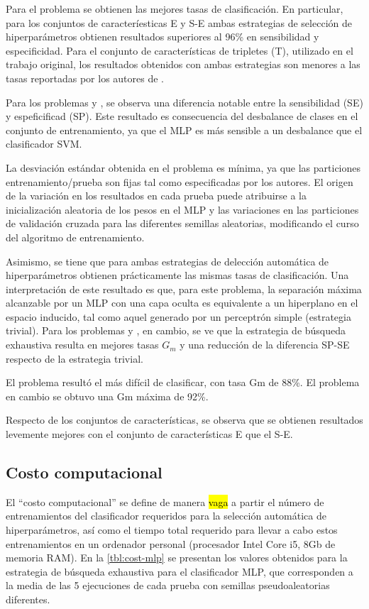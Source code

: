 Para el problema \tripletsvm{} se obtienen las mejores tasas de
clasificación.  En particular, para los conjuntos de caracteríesticas
E y S-E ambas estrategias de selección de hiperparámetros obtienen
resultados superiores al 96\% en sensibilidad y especificidad.  Para
el conjunto de características de tripletes (T), utilizado en el
trabajo original, los resultados obtenidos con ambas estrategias son
menores a las tasas reportadas por los autores de \tripletsvm{}.

Para los problemas \mipred{} y \micropred{}, se observa una diferencia
notable entre la sensibilidad (SE) y espeficificad (SP). Este
resultado es consecuencia del desbalance de clases en el conjunto de
entrenamiento, ya que el MLP es más sensible a un desbalance que el
clasificador SVM.

La desviación estándar obtenida en el problema \tripletsvm{} es
mínima, ya que las particiones entrenamiento/prueba son fijas tal como
especificadas por los autores.  El origen de la variación en los
resultados en cada prueba puede atribuirse a la inicialización
aleatoria de los pesos en el MLP y las variaciones en las particiones
de validación cruzada para las diferentes semillas aleatorias,
modificando el curso del algoritmo de entrenamiento.

Asimismo, se tiene que para \tripletsvm{} ambas estrategias de
delección automática de hiperparámetros obtienen prácticamente las
mismas tasas de clasificación.  Una interpretación de este resultado
es que, para este problema, la separación máxima alcanzable por un MLP
con una capa oculta es equivalente a un hiperplano en el espacio
inducido, tal como aquel generado por un perceptrón simple (estrategia
trivial).  Para los problemas \mipred{} y \micropred{}, en cambio, se
ve que la estrategia de búsqueda exhaustiva resulta en mejores tasas
$G_m$ y una reducción de la diferencia SP-SE respecto de la estrategia
trivial.

El problema \micropred{} resultó el más difícil de clasificar, con
tasa Gm de 88\%. El problema \mipred{} en cambio se obtuvo una Gm
máxima de 92\%.

Respecto de los conjuntos de características, se observa que se
obtienen resultados levemente mejores con el conjunto de
características E que el S-E.

\subsection{Costo computacional}
El ``costo computacional'' se define de manera \hl{vaga} a partir el
número de entrenamientos del clasificador requeridos para la selección
automática de hiperparámetros, así como el tiempo total requerido para
llevar a cabo estos entrenamientos en un ordenador personal
(procesador Intel Core i5, 8\si{\giga b} de memoria RAM).  En la
\autoref{tbl:cost-mlp} se presentan los valores obtenidos para la
estrategia de búsqueda exhaustiva para el clasificador MLP, que
corresponden a la media de las 5 ejecuciones de cada prueba con
semillas pseudoaleatorias diferentes.

